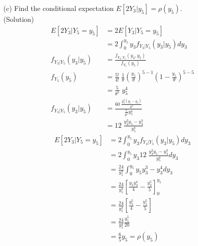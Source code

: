 \documentclass{oblivoir}
\newcommand{\flr}[1]{\left ( #1 \right )}
\newcommand{\tlr}[1]{\left [ #1 \right]}
\newcommand{\blue}[1]{{\color{blue} #1}}
\begin{document}
\begin{enumerate}
\begin{enumerate}
\vspace{3mm}
\item[(c)]
Find the conditional expectation $E[2Y_3|y_5] = \rho(y_5)$. \\
\blue{(Solution)}
\begin{align*}
E[2Y_3|Y_5 = y_5] &= 2 E[Y_3|Y_5 = y_5] \\
&= 2 \int_0^{y_5} y_3 f_{Y_3|Y_5} (y_3|y_5) dy_3 \\
f_{Y_3|Y_5} (y_3|y_5) &= \frac{f_{Y_3, Y_5}(y_3,y_5)}{f_{Y_5} (y_5)} \\
f_{Y_5} (y_5) &= \frac{5!}{4!} \; \frac{1}{\theta} \flr{\frac{y_5}{\theta}}^{5-1} \flr{1- \frac{y_5}{\theta}}^{5-5}\\
&= \frac{5}{\theta^5} \; y_5^4\\
f_{Y_3|Y_5}(y_3|y_5) &= \frac{60 \; \frac{y_3^2(y_5-y_3)}{\theta^5}}{\frac{5}{\theta^5} y_5^4} \\
&= 12 \; \frac{y_3^2y_5 - y_3^3}{y_5^4}
\end{align*}
\begin{align*}
E[2Y_3|Y_5 = y_5] &= 2 \int_0^{y_5} y_3 f_{Y_3|Y_5} (y_3|y_5) dy_3 \\
&= 2 \int_0^{y_5} y_3 12 \; \frac{y_3^2y_5 - y_3^3}{y_5^4} dy_3 \\
&= \frac{24}{y_5^4} \int_0^{y_5} y_5y_3^3 - y_3^4 dy_3 \\
&= \frac{24}{y_5^4} \tlr{\frac{y_5y_3^4}{4} - \frac{y_3^5}{5}}_0^{y_5} \\
&= \frac{24}{y_5^4}\tlr{\frac{y_5^5}{4} - \frac{y_5^5}{5}}\\
&= \frac{24}{y_5^4} \frac{y_5^5}{20} \\
&= \frac{6}{5} y_5 = \rho(y_5)
\end{align*} 


\end{enumerate}
\end{enumerate}
\end{document}
